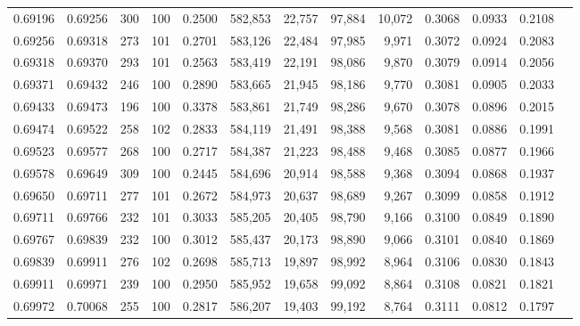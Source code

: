 \begin{tabular}{rrrrrrrrrrrrr}
0.69196 & 0.69256 &   300 & 100 &                                     0.2500 & 582,853 &  22,757 &  97,884 &  10,072 & 0.3068 & 0.0933 & 0.2108 \\
0.69256 & 0.69318 &   273 & 101 &                                     0.2701 & 583,126 &  22,484 &  97,985 &   9,971 & 0.3072 & 0.0924 & 0.2083 \\
0.69318 & 0.69370 &   293 & 101 &                                     0.2563 & 583,419 &  22,191 &  98,086 &   9,870 & 0.3079 & 0.0914 & 0.2056 \\
0.69371 & 0.69432 &   246 & 100 &                                     0.2890 & 583,665 &  21,945 &  98,186 &   9,770 & 0.3081 & 0.0905 & 0.2033 \\
0.69433 & 0.69473 &   196 & 100 &                                     0.3378 & 583,861 &  21,749 &  98,286 &   9,670 & 0.3078 & 0.0896 & 0.2015 \\
0.69474 & 0.69522 &   258 & 102 &                                     0.2833 & 584,119 &  21,491 &  98,388 &   9,568 & 0.3081 & 0.0886 & 0.1991 \\
0.69523 & 0.69577 &   268 & 100 &                                     0.2717 & 584,387 &  21,223 &  98,488 &   9,468 & 0.3085 & 0.0877 & 0.1966 \\
0.69578 & 0.69649 &   309 & 100 &                                     0.2445 & 584,696 &  20,914 &  98,588 &   9,368 & 0.3094 & 0.0868 & 0.1937 \\
0.69650 & 0.69711 &   277 & 101 &                                     0.2672 & 584,973 &  20,637 &  98,689 &   9,267 & 0.3099 & 0.0858 & 0.1912 \\
0.69711 & 0.69766 &   232 & 101 &                                     0.3033 & 585,205 &  20,405 &  98,790 &   9,166 & 0.3100 & 0.0849 & 0.1890 \\
0.69767 & 0.69839 &   232 & 100 &                                     0.3012 & 585,437 &  20,173 &  98,890 &   9,066 & 0.3101 & 0.0840 & 0.1869 \\
0.69839 & 0.69911 &   276 & 102 &                                     0.2698 & 585,713 &  19,897 &  98,992 &   8,964 & 0.3106 & 0.0830 & 0.1843 \\
0.69911 & 0.69971 &   239 & 100 &                                     0.2950 & 585,952 &  19,658 &  99,092 &   8,864 & 0.3108 & 0.0821 & 0.1821 \\
0.69972 & 0.70068 &   255 & 100 &                                     0.2817 & 586,207 &  19,403 &  99,192 &   8,764 & 0.3111 & 0.0812 & 0.1797 \\

\end{tabular}
